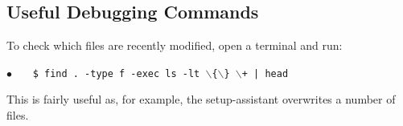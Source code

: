 \subsection*{Useful Debugging Commands}
To check which files are recently modified, open a terminal and run:

\hspace{1cm} \textbf{$\bullet$} \ \ \  \texttt{\$ find . -type f -exec ls -lt $\backslash$\{$\backslash$\} $\backslash$+ | head} 

This is fairly useful as, for example, the setup-assistant overwrites a number of files. 

{}{}

